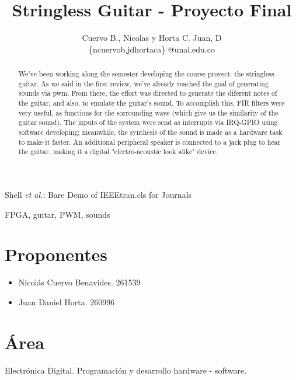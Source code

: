 \documentclass[12pt,journal]{IEEEtran}
\begin{document}
\title{Stringless Guitar - Proyecto Final}
\author{Cuervo B., Nicolas y Horta C. Juan, D \\
 \{ncuervob,jdhortaca\} @unal.edu.co}

%
{Shell \MakeLowercase{\textit{et al.}}: Bare Demo of IEEEtran.cls for Journals}

\maketitle

\begin{abstract}
\boldmath We've been working along the semester developing the course proyect: the stringless guitar. As we said in the first review, we've already reached the goal of generating sounds via pwm. From there, the effort was directed to generate the diferent notes of the guitar, and also, to emulate the guitar's sound. To accomplish this, FIR filters were very useful, as functions for the sorrounding wave (which give us the similarity of the guitar sound). The inputs of the system were send as interrupts via IRQ-GPIO using software developing; meanwhile, the synthesis of the sound is made as a hardware task to make it faster. An additional peripheral speaker is connected to a jack plug to hear the guitar, making it a digital "electro-acoustic look alike" device.
\end{abstract}

\begin{IEEEkeywords}
FPGA, guitar, PWM, sounds
\end{IEEEkeywords}
\section{Proponentes}
\begin{itemize}
	\item{Nicol\'as Cuervo Benavides. 261539}
	\item{Juan Daniel Horta. 260996}
\end{itemize}


\section{\'Area}
Electr\'onica Digital. Programaci\'on y desarrollo hardware - software.
\end{document}
